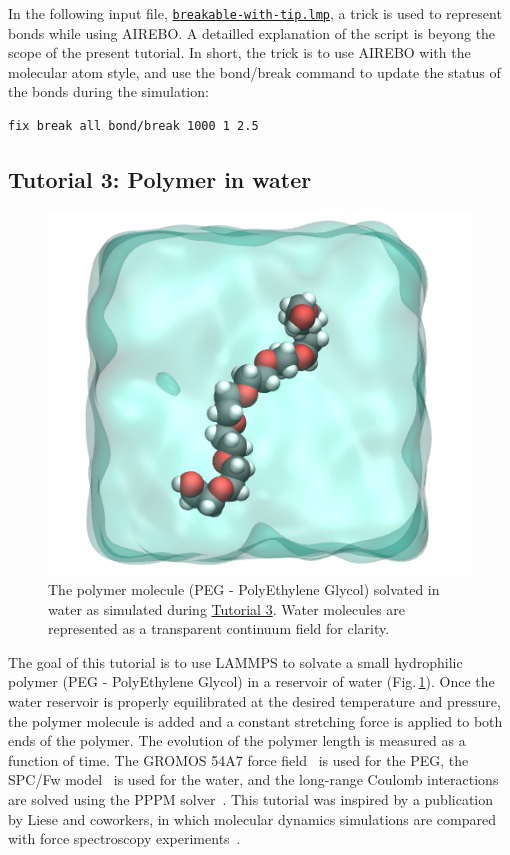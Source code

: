 \documentclass[9pt,tutorial]{livecoms}
\newcommand{\lmpcmd}[1]{\hspace{0pt}\colorbox{listing}{\textcolor{command}{\small{#1}}}\hspace{0pt}} %
\newcommand{\dwlcmd}[1]{\textcolor{download}{\texttt{#1}}} %
\newcommand{\filepath}{https://raw.githubusercontent.com/lammpstutorials/lammpstutorials-article/main/files/}
\begin{document}
In the following input file,
\href{\filepath tutorial2/breakable-with-tip.lmp}{\dwlcmd{breakable-with-tip.lmp}},
a trick is used to represent bonds while using AIREBO.  A detailled
explanation of the script is beyong the scope of the present tutorial.
In short, the trick is to use AIREBO with the molecular atom
style, and use the \lmpcmd{bond/break} command to update the status of the bonds
during the simulation:
\begin{lstlisting}
fix break all bond/break 1000 1 2.5
\end{lstlisting}

\subsection{Tutorial 3: Polymer in water}
\label{all-atom-label}

\begin{figure}
\centering
\includegraphics[width=0.55\linewidth]{PEG}
\caption{The polymer molecule (PEG - PolyEthylene Glycol) solvated in water as
simulated during \hyperref[all-atom-label]{Tutorial 3}.  Water molecules are
represented as a transparent continuum field for clarity.}
\label{fig:PEG}
\end{figure}

\noindent The goal of this tutorial is to use LAMMPS to solvate a small hydrophilic
polymer (PEG - PolyEthylene Glycol) in a reservoir of water (Fig.\,\ref{fig:PEG}).
Once the water reservoir is properly equilibrated at the desired temperature and
pressure, the polymer molecule is added and a constant stretching force is applied
to both ends of the polymer.  The evolution of the polymer length is measured as
a function of time.  The GROMOS 54A7 force field~\cite{schmid2011definition} is used
for the PEG, the SPC/Fw model~\cite{wu2006flexible} is used for the water, and the
long-range Coulomb interactions are solved using the PPPM solver~\cite{luty1996calculating}.
This tutorial was inspired by a publication by Liese and coworkers, in which molecular
dynamics simulations are compared with force spectroscopy experiments~\cite{liese2017hydration}.
\end{document}
